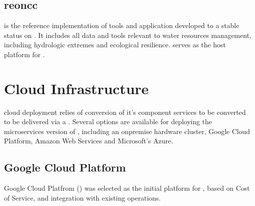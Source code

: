 \documentclass[letterpaper,12pt,english,openany,oneside]{sphinxmanual}
\begin{document}
\sphinxstepscope


\section{reoncc}
\label{\detokenize{euidev/development/_autosummary/reoncc:module-reoncc}}\label{\detokenize{euidev/development/_autosummary/reoncc:reoncc}}\label{\detokenize{euidev/development/_autosummary/reoncc::doc}}
\sphinxAtStartPar
{} is the reference implementation of tools and application developed to a stable status on . It includes all data and tools relevant to water resources management, including hydrologic extremes and ecological resilience.  serves as the host platform for .

\sphinxstepscope


\chapter{Cloud Infrastructure}
\label{\detokenize{euidev/infrastructure/index:cloud-infrastructure}}\label{\detokenize{euidev/infrastructure/index::doc}}
\sphinxAtStartPar
{} cloud deployment relies of conversion of it’s component services to be converted to be delivered via a . Several options are available for deploying the microservices version of , including an on\sphinxhyphen{}premise hardware cluster, Google Cloud Platform, Amazon Web Services and Microsoft’s Azure.


\section{Google Cloud Platform}
\label{\detokenize{euidev/infrastructure/index:google-cloud-platform}}
\sphinxAtStartPar
Google Cloud Platfrom () was selected as the initial platform for , based on Cost of Service, and integration with existing  operations.
\end{document}
